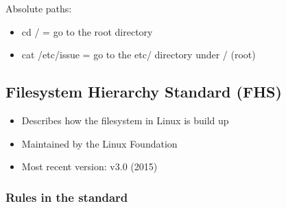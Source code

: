 \documentclass{article}
\begin{document}
Absolute paths:

\begin{itemize}
    \item cd / = go to the root directory
    \item cat /etc/issue = go to the etc/ directory under / (root)
\end{itemize}

\subsection{Filesystem Hierarchy Standard (FHS)}

\begin{itemize}
    \item Describes how the filesystem in Linux is build up
    \item Maintained by the Linux Foundation
    \item Most recent version: v3.0 (2015)
\end{itemize}



\subsubsection{Rules in the standard}
\end{document}
